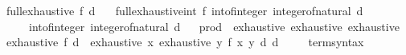 \begin{isabellebody}
\endisatagproof
{\isafoldproof}%
%
\isadelimproof
\isanewline
%
\endisadelimproof
\isanewline
{}\isamarkupfalse%
\ {\isachardoublequoteopen}full{\isacharunderscore}{\kern0pt}exhaustive\ f\ d\ {\isacharequal}{\kern0pt}\isanewline
\ \ full{\isacharunderscore}{\kern0pt}exhaustive{\isacharunderscore}{\kern0pt}int{\isacharprime}{\kern0pt}\ f\ {\isacharparenleft}{\kern0pt}int{\isacharunderscore}{\kern0pt}of{\isacharunderscore}{\kern0pt}integer\ {\isacharparenleft}{\kern0pt}integer{\isacharunderscore}{\kern0pt}of{\isacharunderscore}{\kern0pt}natural\ d{\isacharparenright}{\kern0pt}{\isacharparenright}{\kern0pt}\isanewline
\ \ \ \ {\isacharparenleft}{\kern0pt}{\isacharminus}{\kern0pt}\ {\isacharparenleft}{\kern0pt}int{\isacharunderscore}{\kern0pt}of{\isacharunderscore}{\kern0pt}integer\ {\isacharparenleft}{\kern0pt}integer{\isacharunderscore}{\kern0pt}of{\isacharunderscore}{\kern0pt}natural\ d{\isacharparenright}{\kern0pt}{\isacharparenright}{\kern0pt}{\isacharparenright}{\kern0pt}{\isachardoublequoteclose}\isanewline
\isanewline
{}\isamarkupfalse%
%
\isadelimproof
\ %
\endisadelimproof
%
\isatagproof
\isacommand{{\isachardot}{\kern0pt}{\isachardot}{\kern0pt}}\isamarkupfalse%
%
\endisatagproof
{\isafoldproof}%
%
\isadelimproof
%
\endisadelimproof
\isanewline
\isanewline
{}\isamarkupfalse%
\isanewline
\isanewline
{}\isamarkupfalse%
\ prod\ {\isacharcolon}{\kern0pt}{\isacharcolon}{\kern0pt}\ {\isacharparenleft}{\kern0pt}exhaustive{\isacharcomma}{\kern0pt}\ exhaustive{\isacharparenright}{\kern0pt}\ exhaustive\isanewline
{}\isanewline
\isanewline
{}\isamarkupfalse%
\ {\isachardoublequoteopen}exhaustive\ f\ d\ {\isacharequal}{\kern0pt}\ exhaustive\ {\isacharparenleft}{\kern0pt}{\isasymlambda}x{\isachardot}{\kern0pt}\ exhaustive\ {\isacharparenleft}{\kern0pt}{\isasymlambda}y{\isachardot}{\kern0pt}\ f\ {\isacharparenleft}{\kern0pt}{\isacharparenleft}{\kern0pt}x{\isacharcomma}{\kern0pt}\ y{\isacharparenright}{\kern0pt}{\isacharparenright}{\kern0pt}{\isacharparenright}{\kern0pt}\ d{\isacharparenright}{\kern0pt}\ d{\isachardoublequoteclose}\isanewline
\isanewline
{}\isamarkupfalse%
%
\isadelimproof
\ %
\endisadelimproof
%
\isatagproof
\isacommand{{\isachardot}{\kern0pt}{\isachardot}{\kern0pt}}\isamarkupfalse%
%
\endisatagproof
{\isafoldproof}%
%
\isadelimproof
%
\endisadelimproof
\isanewline
\isanewline
{}\isamarkupfalse%
\isanewline
\isanewline
{}\isamarkupfalse%
\isanewline
\ \ \ term{\isacharunderscore}{\kern0pt}syntax\isanewline

\end{isabellebody}
